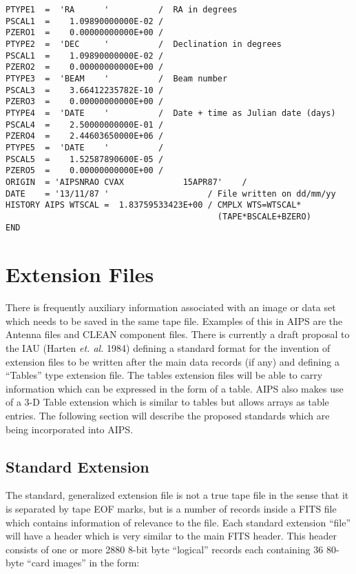 \begin{verbatim}
PTYPE1  =  'RA      '          /  RA in degrees
PSCAL1  =    1.09890000000E-02 /
PZERO1  =    0.00000000000E+00 /
PTYPE2  =  'DEC     '          /  Declination in degrees
PSCAL1  =    1.09890000000E-02 /
PZERO2  =    0.00000000000E+00 /
PTYPE3  =  'BEAM    '          /  Beam number
PSCAL3  =    3.66412235782E-10 /
PZERO3  =    0.00000000000E+00 /
PTYPE4  =  'DATE    '          /  Date + time as Julian date (days)
PSCAL4  =    2.50000000000E-01 /
PZERO4  =    2.44603650000E+06 /
PTYPE5  =  'DATE    '          /
PSCAL5  =    1.52587890600E-05 /
PZERO5  =    0.00000000000E+00 /
ORIGIN  = 'AIPSNRAO CVAX            15APR87'    /
DATE    = '13/11/87 '                    / File written on dd/mm/yy
HISTORY AIPS WTSCAL =  1.83759533423E+00 / CMPLX WTS=WTSCAL*
                                           (TAPE*BSCALE+BZERO)
END

\end{verbatim}

\section{Extension Files }
There is frequently auxiliary information associated with an image or
data set which needs to be saved in the same tape file. Examples of
this in AIPS are the Antenna files and CLEAN component files.  There
is currently a draft proposal to the IAU (Harten {\it et. al.} 1984)
defining a standard format for the invention of extension files to be
written after the main data records (if any) and defining a ``Tables''
type extension file.  The tables extension files will be able to carry
information which can be expressed in the form of a table. AIPS also
makes use of a 3-D Table extension which is similar to tables but
allows arrays as table entries.  The following section will describe
the proposed standards which are being incorporated into AIPS.

\subsection{Standard Extension }
The standard, generalized extension file is not a true tape file in
the sense that it is separated by tape EOF marks, but is a number of
records inside a FITS file which contains information of
relevance to the file.  Each standard extension ``file'' will have a
header which is very similar to the main FITS header.  This header
consists of one or more 2880 8-bit byte ``logical'' records each
containing 36 80-byte ``card images'' in the form:

